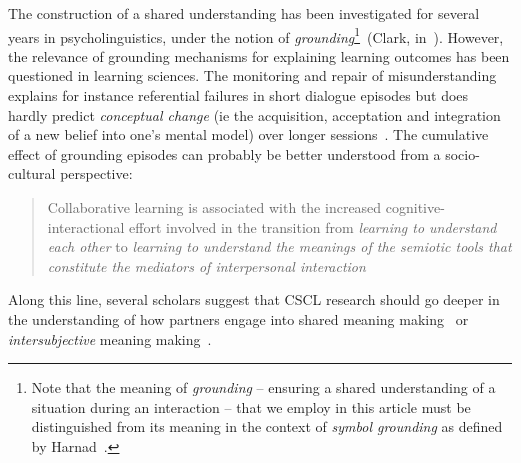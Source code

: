\documentclass[11pt,a4paper]{report}
\begin{document}
The construction of a shared understanding has been investigated for several
years in psycholinguistics, under the  notion of \emph{grounding}\footnote{Note
that the meaning of \emph{grounding} -- ensuring a shared understanding of a
situation during an interaction -- that we employ in this article must be
distinguished from its meaning in the context of \emph{symbol grounding} as
defined by Harnad~\cite{harnad1990symbol}.}~(Clark,
in~\cite{clark1986referring}).  However, the relevance of grounding mechanisms
for explaining learning outcomes has been questioned in learning sciences. The
monitoring and repair of misunderstanding explains for instance referential
failures in short dialogue episodes but does hardly predict \emph{conceptual
change} (ie the acquisition, acceptation and integration of a new belief into
one's mental model) over longer
sessions~\cite{dillenbourg2006sharing}. The cumulative effect of grounding
episodes can probably be better understood from a socio-cultural perspective:

\begin{quote}
Collaborative learning is associated with the increased
cognitive-interactional effort involved in the transition from \emph{learning to
understand each other} to \emph{learning to understand the meanings of the semiotic
tools that constitute the mediators of interpersonal
interaction}~\cite{baker1999role}
\end{quote}

Along this line, several scholars suggest that CSCL research should go deeper in
the understanding of how partners engage into shared meaning
making~\cite{stahl2007meaning} or \emph{intersubjective} meaning
making~\cite{suthers2006technology}.
\end{document}
